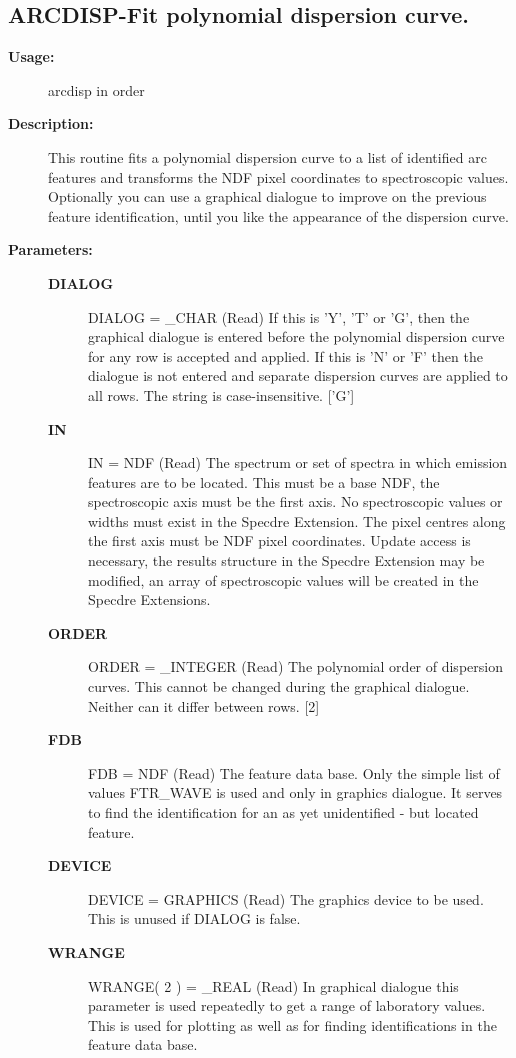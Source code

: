 \subsection{ARCDISP-\label{ARCDISP}Fit polynomial dispersion curve.}
\begin{description}

\item [\textbf{Usage:}]

   arcdisp in order


\item [\textbf{Description:}]
   This routine fits a polynomial dispersion curve to a list of
   identified arc features and transforms the NDF pixel coordinates
   to spectroscopic values. Optionally you can use a graphical
   dialogue to improve on the previous feature identification, until
   you like the appearance of the dispersion curve.


\item [\textbf{Parameters:}]
\begin{description}
\item [\textbf{DIALOG}]
DIALOG = \_CHAR (Read)
   If this is 'Y', 'T' or 'G', then the graphical dialogue is
   entered before the polynomial dispersion curve for any row is
   accepted and applied. If this is 'N' or 'F' then the dialogue
   is not entered and separate dispersion curves are applied to
   all rows. The string is case-insensitive. ['G']
\item [\textbf{IN}]
IN = NDF (Read)
   The spectrum or set of spectra in which emission features are
   to be located. This must be a base NDF, the spectroscopic axis
   must be the first axis. No spectroscopic values or widths must
   exist in the Specdre Extension. The pixel centres along the
   first axis must be NDF pixel coordinates. Update access is
   necessary, the results structure in the Specdre Extension may
   be modified, an array of spectroscopic values will be created
   in the Specdre Extensions.
\item [\textbf{ORDER}]
ORDER = \_INTEGER (Read)
   The polynomial order of dispersion curves. This cannot be changed
   during the graphical dialogue. Neither can it differ between
   rows.  [2]
\item [\textbf{FDB}]
FDB = NDF (Read)
   The feature data base. Only the simple list of values FTR\_WAVE is
   used and only in graphics dialogue. It serves to find the
   identification for an as yet unidentified - but located
   feature.
\item [\textbf{DEVICE}]
DEVICE = GRAPHICS (Read)
   The graphics device to be used. This is unused if DIALOG is
   false.
\item [\textbf{WRANGE}]
WRANGE( 2 ) = \_REAL (Read)
   In graphical dialogue this parameter is used repeatedly to get
   a range of laboratory values. This is used for plotting as well
   as for finding identifications in the feature data base.


\end{description}
\end{description}
